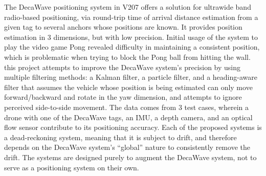 %
The DecaWave positioning system in V207 offers a solution for ultrawide band radio-based positioning,
via round-trip time of arrival distance estimation from a given tag to several anchors whose positions
are known.
It provides position estimation in 3 dimensions, but with low precision.
Initial usage of the system to play the video game Pong revealed difficulty in maintaining a consistent
position, which is problematic when trying to block the Pong ball from hitting the wall.
this project attempts to improve the DecaWave system's precision by using
multiple filtering methods: a Kalman filter, a particle filter, and a heading-aware filter that
assumes the vehicle whose position is being estimated can only move forward/backward
and rotate in the yaw dimension,
and attempts to ignore perceived side-to-side movement.
The data comes from 3 test cases, wherein a drone with one of the DecaWave tags, an IMU, a depth camera,
and an optical flow sensor contribute to its positioning accuracy.
Each of the proposed systems is a dead-reckoning system, meaning that it is subject to drift,
and therefore depends on the DecaWave system's ``global'' nature to consistently remove the drift.
The systems are designed purely to augment the DecaWave system, not to serve as a positioning
system on their own.
